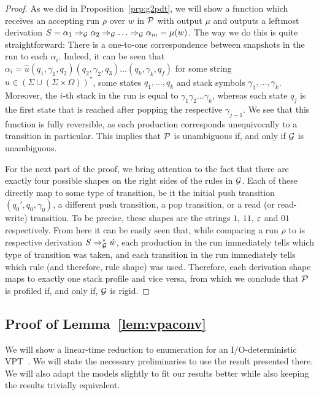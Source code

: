 \begin{proof}
As we did in Proposition~\ref{prp:g2pdt}, we will show a function which receives an accepting run $\rho$ over $w$ in $\mathcal{P}$ with output $\mu$ and outputs a leftmost derivation $S =\alpha_1\Rightarrow_{\mathcal{G}}\alpha_2\Rightarrow_{\mathcal{G}}\ldots\Rightarrow_{\mathcal{G}}\alpha_m = \mu(w)$. The way we do this is quite straightforward: There is a one-to-one correspondence between snapshots in the run to each $\alpha_i$. Indeed, it can be seen that $\alpha_i = \hat{u}(q_1, \gamma_1, q_2)(q_2, \gamma_2, q_3)\ldots(q_k, \gamma_k, q_f)$ for some string $\hat{u}\in (\Sigma\cup(\Sigma\times\Omega))^*$, some states $q_1,\ldots,q_k$ and stack symbols $\gamma_1, \ldots, \gamma_k$. Moreover, the $i$-th stack in the run is equal to $\gamma_1\gamma_2\ldots\gamma_k$, whereas each state $q_j$ is the first state that is reached after popping the respective $\gamma_{j-1}$. We see that this function is fully reversible, as each production corresponds unequivocally to a transition in particular. This implies that $\mathcal{P}$ is unambiguous if, and only if $\mathcal{G}$ is unambiguous.

For the next part of the proof, we bring attention to the fact that there are exactly four possible shapes on the right sides of the rules in $\mathcal{G}$. Each of these directly map to some type of transition, be it the initial push transition $(q_0', q_0, \gamma_0)$, a different push transition, a pop transition, or a read (or read-write) transition. To be precise, these shapes are the strings $1$, $11$, $\varepsilon$ and $01$ respectively. From here it can be easily seen that, while comparing a run $\rho$ to is respective derivation $S\Rightarrow_{\mathcal{G}}^*\hat{w}$, each production in the run immediately tells which type of transition was taken, and each transition in the run immediately tells which rule (and therefore, rule shape) was used. Therefore, each derivation shape maps to exactly one stack profile and vice versa, from which we conclude that $\mathcal{P}$ is profiled if, and only if, $\mathcal{G}$ is rigid.
\end{proof}
	
%
%
%
%
%
%
%
%

\subsection{Proof of Lemma~\ref{lem:vpaconv}}

We will show a linear-time reduction to enumeration for an I/O-deterministic VPT~\cite{icdt2020nested}.
We will state the necessary preliminaries to use the result presented there. We will also adapt the models slightly to fit our results better while also keeping the results trivially equivalent.

